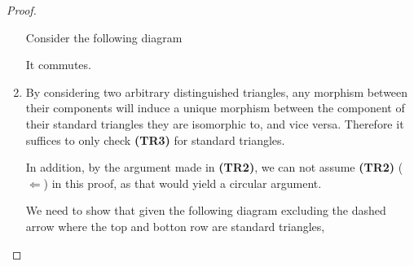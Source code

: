 \begin{proof}
\begin{enumerate}[label={(\bfseries TR\arabic*)}]
{            Consider the following diagram
            \begin{center}
            \end{center}
            It commutes.
        }
        \item {
            By considering two arbitrary distinguished triangles, any morphism between their components will induce a unique morphism between the component of their standard triangles they are isomorphic to, and vice versa. Therefore it suffices to only check {\bf (TR3)} for standard triangles.

            In addition, by the argument made in {\bf (TR2)}, we can not assume {\bf (TR2)} (\( \Leftarrow \)) in this proof, as that would yield a circular argument.

            We need to show that given the following diagram excluding the dashed arrow where the top and botton row are standard triangles,
            \begin{diagramlabel}[\label{eq:stablemod}]
\end{diagramlabel}}
\end{enumerate}
\end{proof}
